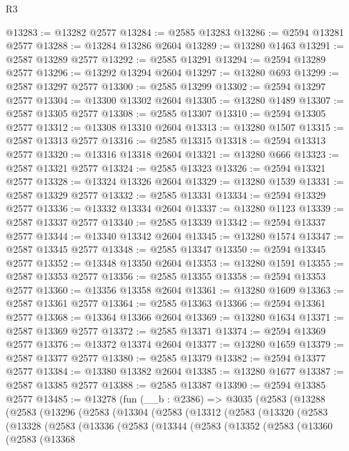 \begin{lexlean}{R3}
\begin{coremodule}
@13283 := @13282 @2577
@13284 := @2585 @13283
@13286 := @2594 @13281 @2577
@13288 := @13284 @13286 @2604
@13289 := @13280 @1463
@13291 := @2587 @13289 @2577
@13292 := @2585 @13291
@13294 := @2594 @13289 @2577
@13296 := @13292 @13294 @2604
@13297 := @13280 @693
@13299 := @2587 @13297 @2577
@13300 := @2585 @13299
@13302 := @2594 @13297 @2577
@13304 := @13300 @13302 @2604
@13305 := @13280 @1489
@13307 := @2587 @13305 @2577
@13308 := @2585 @13307
@13310 := @2594 @13305 @2577
@13312 := @13308 @13310 @2604
@13313 := @13280 @1507
@13315 := @2587 @13313 @2577
@13316 := @2585 @13315
@13318 := @2594 @13313 @2577
@13320 := @13316 @13318 @2604
@13321 := @13280 @666
@13323 := @2587 @13321 @2577
@13324 := @2585 @13323
@13326 := @2594 @13321 @2577
@13328 := @13324 @13326 @2604
@13329 := @13280 @1539
@13331 := @2587 @13329 @2577
@13332 := @2585 @13331
@13334 := @2594 @13329 @2577
@13336 := @13332 @13334 @2604
@13337 := @13280 @1123
@13339 := @2587 @13337 @2577
@13340 := @2585 @13339
@13342 := @2594 @13337 @2577
@13344 := @13340 @13342 @2604
@13345 := @13280 @1574
@13347 := @2587 @13345 @2577
@13348 := @2585 @13347
@13350 := @2594 @13345 @2577
@13352 := @13348 @13350 @2604
@13353 := @13280 @1591
@13355 := @2587 @13353 @2577
@13356 := @2585 @13355
@13358 := @2594 @13353 @2577
@13360 := @13356 @13358 @2604
@13361 := @13280 @1609
@13363 := @2587 @13361 @2577
@13364 := @2585 @13363
@13366 := @2594 @13361 @2577
@13368 := @13364 @13366 @2604
@13369 := @13280 @1634
@13371 := @2587 @13369 @2577
@13372 := @2585 @13371
@13374 := @2594 @13369 @2577
@13376 := @13372 @13374 @2604
@13377 := @13280 @1659
@13379 := @2587 @13377 @2577
@13380 := @2585 @13379
@13382 := @2594 @13377 @2577
@13384 := @13380 @13382 @2604
@13385 := @13280 @1677
@13387 := @2587 @13385 @2577
@13388 := @2585 @13387
@13390 := @2594 @13385 @2577
@13485 := @13278
    (fun (__b : @2386) =>
    @3035
      (@2583
        (@13288
          (@2583
            (@13296
              (@2583
                (@13304
                  (@2583
                    (@13312
                      (@2583
                        (@13320
                          (@2583
                            (@13328
                              (@2583
                                (@13336
                                  (@2583
                                    (@13344
                                      (@2583
                                        (@13352
                                          (@2583
                                            (@13360
                                              (@2583
                                                (@13368

\end{coremodule}
\end{lexlean}
